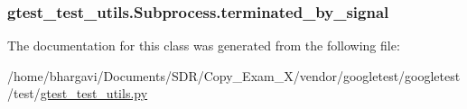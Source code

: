 \subsubsection[{\texorpdfstring{terminated\+\_\+by\+\_\+signal}{terminated_by_signal}}]{\setlength{\rightskip}{0pt plus 5cm}gtest\+\_\+test\+\_\+utils.\+Subprocess.\+terminated\+\_\+by\+\_\+signal}\hypertarget{classgtest__test__utils_1_1_subprocess_a9654b9eddd43c93acf66d5c7b0026fca}{}\label{classgtest__test__utils_1_1_subprocess_a9654b9eddd43c93acf66d5c7b0026fca}


The documentation for this class was generated from the following file\+:\begin{DoxyCompactItemize}
\item 
/home/bhargavi/\+Documents/\+S\+D\+R/\+Copy\+\_\+\+Exam\+\_\+X/vendor/googletest/googletest/test/\hyperlink{gtest__test__utils_8py}{gtest\+\_\+test\+\_\+utils.\+py}\end{DoxyCompactItemize}
